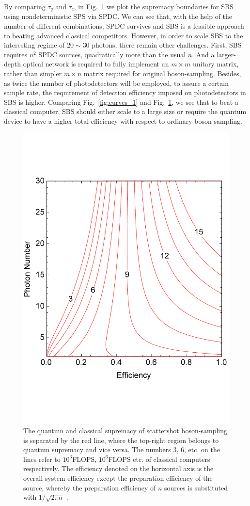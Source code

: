 \documentclass[aps,rmp,twocolumn,amsmath,amssymb,nofootinbib,superscriptaddress]{revtex4}
\newcommand{\comment}[1]{{\color{blue}{#1}}}
\begin{document}
By comparing $\tau_q$ and $\tau_c$, in Fig.~\ref{fig:curve_scattershot} we plot the supremacy boundaries for SBS using nondeterministic SPS via SPDC. We can see that, with the help of the number of different combinations, SPDC survives and SBS is a feasible approach to beating advanced classical competitors. However, in order to scale SBS to the interesting regime of $20\sim 30$ photons, there remain other challenges. First, SBS requires $n^2$ SPDC sources, quadratically more than the usual $n$. And a larger-depth optical network is required to fully implement an $m\times m$ unitary matrix, rather than simpler $m\times n$ matrix required for original boson-sampling. Besides, as twice the number of photodetectors will be employed, to assure a certain sample rate, the requirement of detection efficiency imposed on photodetectors in SBS is higher. Comparing Fig.~\ref{fig:curves_1} and Fig.~\ref{fig:curve_scattershot}, we see that to beat a classical computer, SBS should either scale to a large size or require the quantum device to have a higher total efficiency with respect to ordinary boson-sampling.

\begin{figure}[!htb]
\includegraphics[width=0.5\columnwidth]{curve_scattershot}
\caption{The quantum and classical supremacy of scattershot boson-sampling is separated by the red line, where the top-right region belongs to quantum supremacy and vice versa. The numbers 3, 6, etc. on the lines refer to $10^3$FLOPS, $10^6$FLOPS etc. of classical computers respectively. The efficiency denoted on the horizontal axis is the overall system efficiency \comment{(is that efficiency per mode, or total efficiency??)} except the preparation efficiency of the source, whereby the preparation efficiency of $n$ sources is substituted with $1/\sqrt{2\pi n}$ \cite{bib:36}.} \label{fig:curve_scattershot}
\end{figure}
\end{document}
